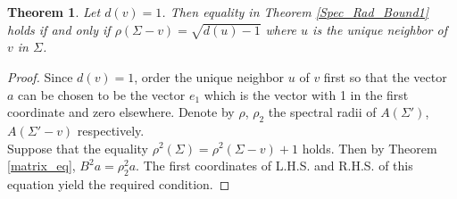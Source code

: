 \documentclass[12pt]{article}
\theoremstyle{plain}
\newtheorem{theorem}{Theorem}[section]
\numberwithin{equation}{section}
\begin{document}
	\begin{theorem}
		Let $d(v)=1$. Then equality in Theorem \ref{Spec_Rad_Bound1} holds if and only if $\rho(\Sigma-v) = \sqrt{d(u)-1}$ where $u$ is the unique neighbor of $v$ in $\Sigma$.
	\end{theorem}
	\begin{proof}
		Since $d(v)=1$, order the unique neighbor $u$ of $v$ first so that the vector $a$ can be chosen to be the vector $e_1$ which is the vector with 1 in the first coordinate and zero elsewhere. Denote by $\rho$, $\rho_2$ the spectral radii of $A(\Sigma')$, $A(\Sigma'-v)$ respectively. \\
		Suppose that the equality $\rho^2(\Sigma) = \rho^2(\Sigma-v) +1$ holds. Then by Theorem \ref{matrix_eq}, $B^2 a = \rho_2 ^2 a$. The first coordinates of L.H.S. and R.H.S. of this equation yield the required condition.
		
		

\end{proof}
\end{document}

